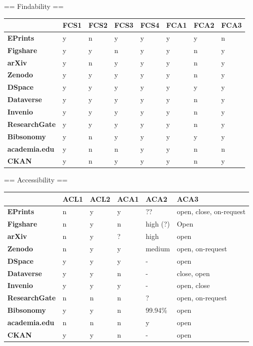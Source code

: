 == Findability  ==

\begin{tabular}{|m{2.1cm}|m{0.8cm}|m{0.8cm}|m{0.8cm}|m{0.8cm}|m{0.8cm}|m{0.8cm}|m{0.8cm}|} \hline 
 & \textbf{FCS1}  & \textbf{FCS2}  & \textbf{FCS3}  & \textbf{FCS4}  & \textbf{FCA1}  & \textbf{FCA2}  & \textbf{FCA3}  \\ \hline \textbf{EPrints}  &y &n &y &y &y &y &n \\ \hline 
\textbf{Figshare}  &y &y &n &y &y &n &y \\ \hline 
\textbf{arXiv}  &y &n &y &y &y &n &y \\ \hline 
\textbf{Zenodo}  &y &y &y &y &y &n &y \\ \hline 
\textbf{DSpace}  &y &y &y &y &y &y &y \\ \hline 
\textbf{Dataverse}  &y &y &y &y &y &n &y \\ \hline 
\textbf{Invenio}  &y &y &y &y &y &n &y \\ \hline 
\textbf{ResearchGate}  &y &y &y &y &y &n &y \\ \hline 
\textbf{Bibsonomy}  &y &n &y &y &y &y &y \\ \hline 
\textbf{academia.edu}  &y &n &n &y &y &n &n \\ \hline 
\textbf{CKAN}  &y &n &y &y &y &n &y \\ \hline 
 \end{tabular}


== Accessibility ==

\begin{tabular}{|m{2.1cm}|m{0.8cm}|m{0.8cm}|m{0.8cm}|m{0.8cm}|m{0.8cm}|} \hline 
 & \textbf{ACL1}  & \textbf{ACL2}  & \textbf{ACA1}  & \textbf{ACA2}  & \textbf{ACA3}  \\ \hline \textbf{EPrints}  &n &y &y &?? &open, close, on-request \\ \hline 
\textbf{Figshare}  &n &y &n &high (?) &Open \\ \hline 
\textbf{arXiv}  &n &y &? &high &open \\ \hline 
\textbf{Zenodo}  &n &y &y &medium &open, on-request \\ \hline 
\textbf{DSpace}  &y &y &y &- &open \\ \hline 
\textbf{Dataverse}  &y &y &n &- &close, open \\ \hline 
\textbf{Invenio}  &y &y &y &- &open, close \\ \hline 
\textbf{ResearchGate}  &n &n &n &? &open, on-request \\ \hline 
\textbf{Bibsonomy}  &y &y &n &99.94\% &open \\ \hline 
\textbf{academia.edu}  &n &n &n &y &open \\ \hline 
\textbf{CKAN}  &y &y &n &- &open \\ \hline 
 \end{tabular}


